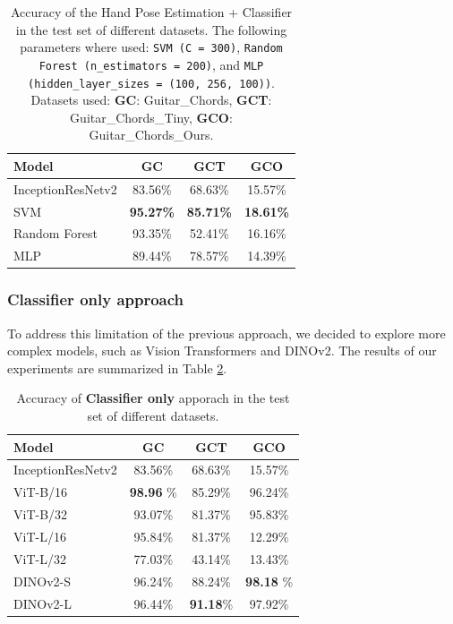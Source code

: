 \documentclass[10pt,twocolumn,letterpaper]{article}
\begin{document}
\begin{table}[h]
    \centering
    \begin{tabular}{lccc}
        \toprule
        \textbf{Model}    & \textbf{GC} & \textbf{GCT} & \textbf{GCO} \\
        \midrule
        InceptionResNetv2 & 83.56\%     & 68.63\%      & 15.57\%      \\
        \midrule
        SVM               & \textbf{95.27\%}     & \textbf{85.71\%}     & \textbf{18.61\%}      \\
        Random Forest     & 93.35\%     & 52.41\%      & 16.16\%      \\
        MLP               & 89.44\%     & 78.57\%      & 14.39\%      \\
        \bottomrule
    \end{tabular}
    \caption{Accuracy of the Hand Pose Estimation + Classifier in the test set of different datasets. The following parameters where used: \texttt{SVM (C = 300)}, \texttt{Random Forest (n\_estimators = 200)}, and \texttt{MLP (hidden\_layer\_sizes = (100, 256, 100))}. Datasets used: \textbf{GC}: Guitar\_Chords, \textbf{GCT}: Guitar\_Chords\_Tiny, \textbf{GCO}: Guitar\_Chords\_Ours.}
    \label{tab:handpose-classifier-results}
\end{table}

\subsubsection{Classifier only approach}
To address this limitation of the previous approach, we decided to explore more complex models, such as Vision Transformers and DINOv2. The results of our experiments are summarized in Table \ref{tab:transformer-models-results}.

\begin{table}[h]
    \centering
    \begin{tabular}{lccc}
        \toprule
        \textbf{Model}    & \textbf{GC} & \textbf{GCT} & \textbf{GCO} \\
        \midrule
        InceptionResNetv2 & 83.56\%     & 68.63\%      & 15.57\%      \\
        \midrule
        ViT-B/16          & \textbf{98.96} \%     & 85.29\%      & 96.24\%      \\
        ViT-B/32          & 93.07\%     & 81.37\%      & 95.83\%      \\
        ViT-L/16          & 95.84\%     & 81.37\%      & 12.29\%      \\
        ViT-L/32          & 77.03\%     & 43.14\%      & 13.43\%      \\
        DINOv2-S          & 96.24\%     & 88.24\%      & \textbf{98.18} \%      \\
        DINOv2-L          & 96.44\%     & \textbf{91.18}\%      & 97.92\%      \\
        \bottomrule
    \end{tabular}
    \caption{Accuracy of \textbf{Classifier only} apporach in the test set of different datasets.}
    \label{tab:transformer-models-results}
\end{table}
\end{document}

